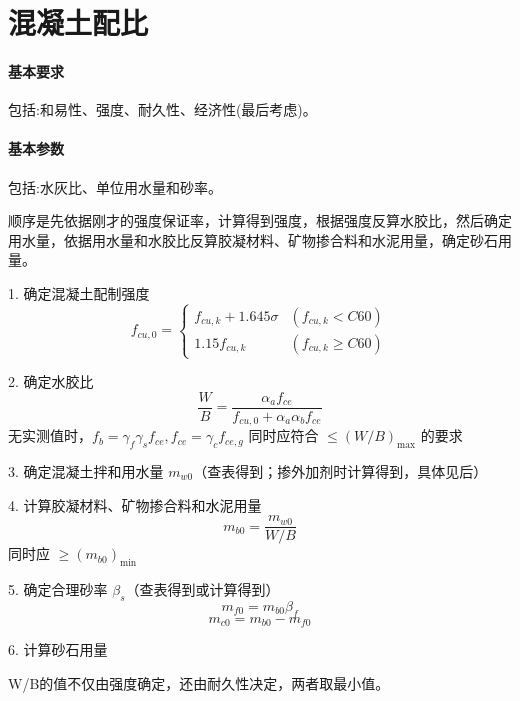 \documentclass[12pt, a4paper, oneside, UTF8]{ctexbook}
\begin{document}
\section{混凝土配比}
\begin{theorem}
\paragraph{基本要求}
包括:和易性、强度、耐久性、经济性(最后考虑)。
\paragraph{基本参数}
包括:水灰比、单位用水量和砂率。
\end{theorem}

顺序是先依据刚才的强度保证率，计算得到强度，根据强度反算水胶比，然后确定用水量，依据用水量和水胶比反算胶凝材料、矿物掺合料和水泥用量，确定砂石用量。

1. 确定混凝土配制强度
\[ f_{cu,0} = \begin{cases}f_{cu,k} + 1.645 \sigma & (f_{cu,k} < C60) \\  1.15 f_{cu,k} & (f_{cu,k} \geq C60)  \end{cases}\]

2. 确定水胶比
\[ \frac{W}{B} = \frac{\alpha_{a} f_{ce}}{f_{cu,0} + \alpha_{a} \alpha_{b} f_{ce}} \]
无实测值时，\( f_{b} = \gamma_{f} \gamma_{s} f_{ce}, f_{ce} = \gamma_{c} f_{ce,g} \)
同时应符合 \( \leq (W/B)_{\text{max}} \) 的要求

3. 确定混凝土拌和用水量 \( m_{w0} \)（查表得到；掺外加剂时计算得到，具体见后）

4. 计算胶凝材料、矿物掺合料和水泥用量
\[ m_{b0} = \frac{m_{w0}}{W/B} \]
同时应 \( \geq (m_{b0})_{\text{min}} \)

5. 确定合理砂率 \( \beta_{s} \)（查表得到或计算得到）
\[ m_{f0} = m_{b0} \beta_{f} \]
\[ m_{c0} = m_{b0} - m_{f0} \]

6. 计算砂石用量\\

\begin{remark}
    W/B的值不仅由强度确定，还由耐久性决定，两者取最小值。
\end{remark}

\newpage
\end{document}
